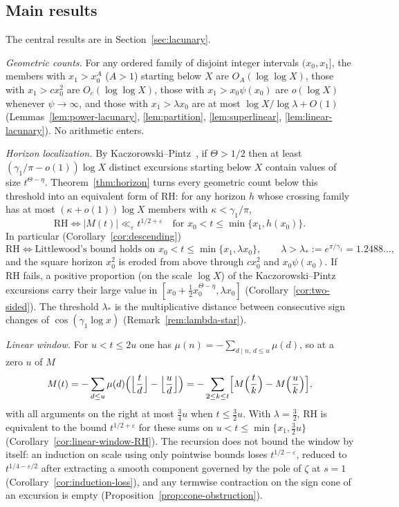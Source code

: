 \documentclass[11pt]{amsart}
\numberwithin{equation}{section}
\theoremstyle{plain}
\theoremstyle{definition}
\theoremstyle{remark}
\newcommand{\eps}{\varepsilon}
\begin{document}
\subsection*{Main results}

The central results are in Section~\ref{sec:lacunary}.

\smallskip\noindent\emph{Geometric counts.} For any ordered family of
disjoint integer intervals $(x_{0},x_{1}]$, the members with $x_1>x_0^A$
($A>1$) starting below $X$ are $O_A(\log\log X)$, those with
$x_1>cx_0^2$ are $O_c(\log\log X)$, those with $x_1>x_0\psi(x_0)$ are
$o(\log X)$ whenever $\psi\to\infty$, and those with $x_1>\lambda x_0$ are at
most $\log X/\log\lambda+O(1)$ (Lemmas~\ref{lem:power-lacunary},
\ref{lem:partition}, \ref{lem:superlinear}, \ref{lem:linear-lacunary}). No
arithmetic enters.

\smallskip\noindent\emph{Horizon localization.} By
Kaczorowski--Pintz~\cite{KP86}, if $\Theta>1/2$ then at least
$(\gamma_1/\pi-o(1))\log X$ distinct excursions starting below $X$ contain
values of size $t^{\Theta-\eta}$. Theorem~\ref{thm:horizon} turns every
geometric count below this threshold into an equivalent form of RH: for any
horizon $h$ whose crossing family has at most $(\kappa+o(1))\log X$ members
with $\kappa<\gamma_1/\pi$,
\[
\mathrm{RH}\iff |M(t)|\ll_\eps t^{1/2+\eps}\quad\text{for }x_0<t\le\min\{x_1,h(x_0)\}.
\]
In particular (Corollary~\ref{cor:descending})
\[
\mathrm{RH}\iff\text{Littlewood's bound holds on }x_0<t\le\min\{x_1,\lambda x_0\},
\qquad\lambda>\lambda_*:=e^{\pi/\gamma_1}=1.2488\ldots,
\]
and the square horizon $x_0^2$ is eroded from above through $cx_0^2$ and
$x_0\psi(x_0)$. If RH fails, a positive proportion (on the scale $\log X$) of the
Kaczorowski--Pintz excursions carry their large value in
$[x_0+\frac12x_0^{\Theta-\eta},\lambda x_0]$ (Corollary~\ref{cor:two-sided}). The threshold $\lambda_*$ is the multiplicative distance
between consecutive sign changes of $\cos(\gamma_1\log x)$
(Remark~\ref{rem:lambda-star}).

\smallskip\noindent\emph{Linear window.} For $u<t\le2u$ one has
$\mu(n)=-\sum_{d\mid n,\,d\le u}\mu(d)$, so at a zero $u$ of $M$
\[
M(t)=-\sum_{d\le u}\mu(d)\Bigl(\Bigl\lfloor\frac td\Bigr\rfloor-\Bigl\lfloor\frac ud\Bigr\rfloor\Bigr)
=-\sum_{2\le k\le t}\Bigl[M\Bigl(\frac tk\Bigr)-M\Bigl(\frac uk\Bigr)\Bigr],
\]
with all arguments on the right at most $\frac34u$ when $t\le\frac32u$.
With $\lambda=\frac32$, RH is equivalent to the bound $t^{1/2+\eps}$ for
these sums on $u<t\le\min\{x_1,\frac32u\}$
(Corollary~\ref{cor:linear-window-RH}). The recursion does not bound the window by
itself: an induction on scale using only pointwise bounds loses
$t^{1/2-\eps}$, reduced to $t^{1/4-\eps/2}$ after extracting a smooth
component governed by the pole of $\zeta$ at $s=1$
(Corollary~\ref{cor:induction-loss}), and any termwise contraction on the
sign cone of an excursion is empty (Proposition~\ref{prop:cone-obstruction}).
\end{document}
